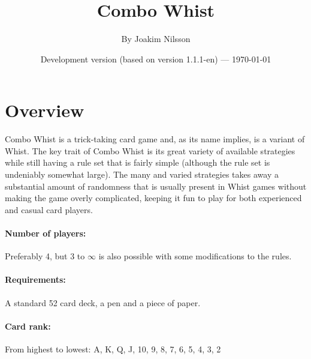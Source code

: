 \documentclass[a4paper]{article}
\title{Combo Whist}
\author{By Joakim Nilsson}
\date{Development version (based on version 1.1.1-en) --- \today}
\begin{document}
	\introPages

	\section{Overview}{%
		Combo Whist is a trick-taking card game and, as its name implies, is a variant of Whist. The key trait of Combo Whist is its great variety of available strategies while still having a rule set that is fairly simple (although the rule set is undeniably somewhat large). The many and varied strategies takes away a substantial amount of randomness that is usually present in Whist games without making the game overly complicated, keeping it fun to play for both experienced and casual card players.

		\paragraph{Number of players:}
		Preferably 4, but 3 to $\infty$ is also possible with some modifications to the rules.

		\paragraph{Requirements:}
		A standard 52 card deck, a pen and a piece of paper.

		\paragraph{Card rank:}
		From highest to lowest: A, K, Q, J, 10, 9, 8, 7, 6, 5, 4, 3, 2
	}
\end{document}
